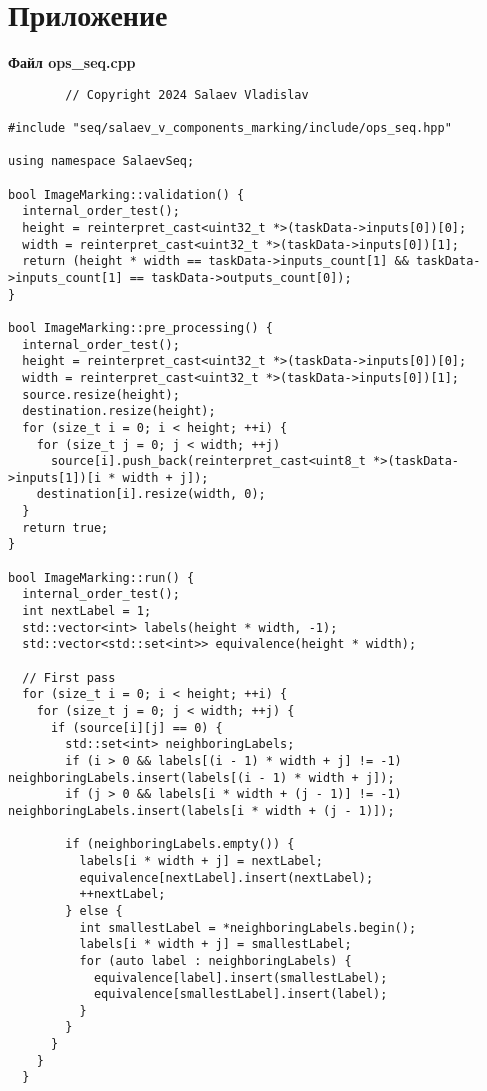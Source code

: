 \documentclass[a4paper, 14pt]{article}
\begin{document}
	\section*{\centering Приложение}
	\textbf{Файл ops\_seq.cpp}
	\begin{verbatim}
		// Copyright 2024 Salaev Vladislav

#include "seq/salaev_v_components_marking/include/ops_seq.hpp"

using namespace SalaevSeq;

bool ImageMarking::validation() {
  internal_order_test();
  height = reinterpret_cast<uint32_t *>(taskData->inputs[0])[0];
  width = reinterpret_cast<uint32_t *>(taskData->inputs[0])[1];
  return (height * width == taskData->inputs_count[1] && taskData->inputs_count[1] == taskData->outputs_count[0]);
}

bool ImageMarking::pre_processing() {
  internal_order_test();
  height = reinterpret_cast<uint32_t *>(taskData->inputs[0])[0];
  width = reinterpret_cast<uint32_t *>(taskData->inputs[0])[1];
  source.resize(height);
  destination.resize(height);
  for (size_t i = 0; i < height; ++i) {
    for (size_t j = 0; j < width; ++j)
      source[i].push_back(reinterpret_cast<uint8_t *>(taskData->inputs[1])[i * width + j]);
    destination[i].resize(width, 0);
  }
  return true;
}

bool ImageMarking::run() {
  internal_order_test();
  int nextLabel = 1;
  std::vector<int> labels(height * width, -1);
  std::vector<std::set<int>> equivalence(height * width);

  // First pass
  for (size_t i = 0; i < height; ++i) {
    for (size_t j = 0; j < width; ++j) {
      if (source[i][j] == 0) {
        std::set<int> neighboringLabels;
        if (i > 0 && labels[(i - 1) * width + j] != -1) neighboringLabels.insert(labels[(i - 1) * width + j]);
        if (j > 0 && labels[i * width + (j - 1)] != -1) neighboringLabels.insert(labels[i * width + (j - 1)]);

        if (neighboringLabels.empty()) {
          labels[i * width + j] = nextLabel;
          equivalence[nextLabel].insert(nextLabel);
          ++nextLabel;
        } else {
          int smallestLabel = *neighboringLabels.begin();
          labels[i * width + j] = smallestLabel;
          for (auto label : neighboringLabels) {
            equivalence[label].insert(smallestLabel);
            equivalence[smallestLabel].insert(label);
          }
        }
      }
    }
  }


\end{verbatim}
\end{document}
